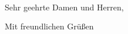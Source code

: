 \documentclass[12pt]{letter}
\begin{document}
	\begin{letter}{ \\ \\ \\ }
		\opening{Sehr geehrte Damen und Herren,}
		
		\closing{Mit freundlichen Grüßen}
	\end{letter}
\end{document}
